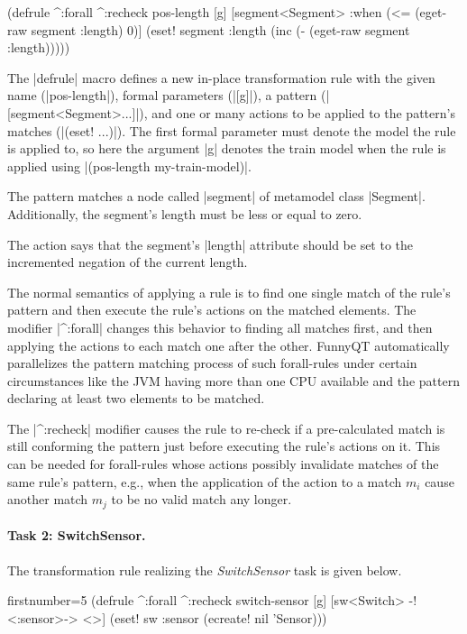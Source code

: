 \documentclass[submission]{eptcs}
\newcommand{\code}{\clojureinline}
\begin{document}
\begin{clojurecode}
(defrule ^:forall ^:recheck pos-length [g]
  [segment<Segment>
   :when (<= (eget-raw segment :length) 0)]
  (eset! segment :length (inc (- (eget-raw segment :length)))))
\end{clojurecode}

The \code|defrule| macro defines a new in-place transformation rule with the
given name (\code|pos-length|), formal parameters (\code|[g]|), a pattern
(\code|[segment<Segment>...]|), and one or many actions to be applied to the
pattern's matches (\code|(eset! ...)|).  The first formal parameter must denote
the model the rule is applied to, so here the argument \code|g| denotes the
train model when the rule is applied using \code|(pos-length my-train-model)|.

The pattern matches a node called \code|segment| of metamodel class
\code|Segment|.  Additionally, the segment's length must be less or equal to
zero.

The action says that the segment's \code|length| attribute should be set to the
incremented negation of the current length.

The normal semantics of applying a rule is to find one single match of the
rule's pattern and then execute the rule's actions on the matched elements.
The modifier \code|^:forall| changes this behavior to finding all matches
first, and then applying the actions to each match one after the other.
FunnyQT automatically parallelizes the pattern matching process of such
forall-rules under certain circumstances like the JVM having more than one CPU
available and the pattern declaring at least two elements to be matched.

The \code|^:recheck| modifier causes the rule to re-check if a pre-calculated
match is still conforming the pattern just before executing the rule's actions
on it.  This can be needed for forall-rules whose actions possibly invalidate
matches of the same rule's pattern, e.g., when the application of the action to
a match \(m_i\) cause another match \(m_j\) to be no valid match any longer.


\paragraph{Task 2: SwitchSensor.}

The transformation rule realizing the \emph{SwitchSensor} task is given below.

\begin{clojurecode*}{firstnumber=5}
(defrule ^:forall ^:recheck switch-sensor [g]
  [sw<Switch> -!<:sensor>-> <>]
  (eset! sw :sensor (ecreate! nil 'Sensor)))
\end{clojurecode*}
\end{document}
